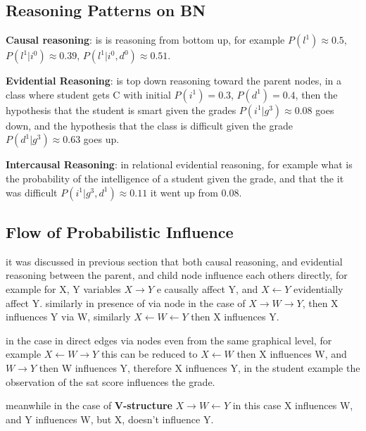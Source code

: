 \documentclass[4apaper,12pt]{book}
\begin{document}
\begin{description}
\begin{description}
      \section{Reasoning Patterns on BN}
      \begin{description}
      \item \textbf{Causal reasoning}: is is reasoning from bottom up, for example $P(l^1) \approx 0.5$,  $P(l^1 | i^0) \approx 0.39$,  $P(l^1 | i^0,d^0) \approx 0.51$.
      \item \textbf{Evidential Reasoning}: is top down reasoning toward the parent nodes, in a class where student gets C with initial $P(i^1)=0.3$, $P(d^1)=0.4$, then the hypothesis that the student is smart given the grades  $P(i^1 |g^3)\approx 0.08$ goes down, and the hypothesis that the class is difficult given the grade  $P(d^1|g^3)\approx 0.63$ goes up.
      \item \textbf{Intercausal Reasoning}: in relational evidential reasoning, for example what is the probability of the intelligence of a student given the grade, and that the it was difficult $P(i^1|g^3,d^1)\approx 0.11$ it went up from 0.08.
        \section{Flow of Probabilistic Influence}
        \begin{description}
        \item it was discussed in previous section that both causal reasoning, and evidential reasoning between the parent, and child node influence each others directly, for example for X, Y variables $ X \rightarrow Y $ e causally affect Y, and $ X \leftarrow Y $ evidentially affect Y. similarly in presence of via node in the case of $X \rightarrow W \rightarrow Y$, then X influences Y via W, similarly $X \leftarrow W \leftarrow Y$ then X influences Y.
        \item in the case in direct edges via nodes even from the same graphical level, for example $ X \leftarrow W \rightarrow Y$ this can be reduced to $ X \leftarrow W $ then X influences W, and $ W \rightarrow Y$ then W influences Y, therefore X influences Y, in the student example the observation of the sat score influences the grade.
        \item meanwhile in the case of \textbf{V-structure} $ X \rightarrow W \leftarrow Y $  in this case X influences W, and Y influences W, but X, doesn't influence Y.
        \end{description}

\end{description}
\end{description}
\end{description}
\end{document}
